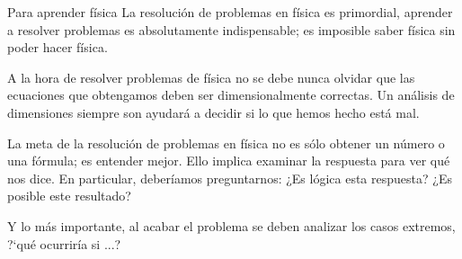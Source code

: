 \newpage %

\begin{myalertblock}{Para aprender física}
La resolución de problemas en física es primordial, aprender a resolver problemas es absolutamente indispensable; es imposible saber física sin poder hacer física.

\vspace{2mm}A la hora de resolver problemas de física no se debe nunca olvidar que las ecuaciones que obtengamos deben ser dimensionalmente correctas. Un análisis de dimensiones siempre son ayudará a decidir si lo que hemos hecho está mal.

\vspace{2mm}La meta de la resolución de problemas en física no es sólo obtener un número o una fórmula; es entender mejor. Ello implica examinar la respuesta para ver qué nos dice. En particular,  deberíamos preguntarnos: ¿Es lógica esta respuesta? ¿Es posible este resultado?

\vspace{2mm}Y lo más importante, al acabar el problema se deben analizar los casos extremos, ?`qué ocurriría si ...?
\end{myalertblock}









